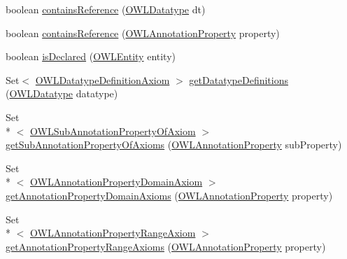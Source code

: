 \begin{DoxyCompactItemize}
\item 
boolean \hyperlink{classuk_1_1ac_1_1manchester_1_1cs_1_1owl_1_1owlapi_1_1_o_w_l_ontology_impl_a3eb0fbd8bcabab6b234bc5ed42908f66}{contains\-Reference} (\hyperlink{interfaceorg_1_1semanticweb_1_1owlapi_1_1model_1_1_o_w_l_datatype}{O\-W\-L\-Datatype} dt)
\item 
boolean \hyperlink{classuk_1_1ac_1_1manchester_1_1cs_1_1owl_1_1owlapi_1_1_o_w_l_ontology_impl_a48f27c2a51e95c68c7d36fbe5a88034d}{contains\-Reference} (\hyperlink{interfaceorg_1_1semanticweb_1_1owlapi_1_1model_1_1_o_w_l_annotation_property}{O\-W\-L\-Annotation\-Property} property)
\item 
boolean \hyperlink{classuk_1_1ac_1_1manchester_1_1cs_1_1owl_1_1owlapi_1_1_o_w_l_ontology_impl_a5e67787dcb7f5c838d063727f772ec26}{is\-Declared} (\hyperlink{interfaceorg_1_1semanticweb_1_1owlapi_1_1model_1_1_o_w_l_entity}{O\-W\-L\-Entity} entity)
\item 
Set$<$ \hyperlink{interfaceorg_1_1semanticweb_1_1owlapi_1_1model_1_1_o_w_l_datatype_definition_axiom}{O\-W\-L\-Datatype\-Definition\-Axiom} $>$ \hyperlink{classuk_1_1ac_1_1manchester_1_1cs_1_1owl_1_1owlapi_1_1_o_w_l_ontology_impl_a67fe947e597cdf74ef70600b6d9d7ecf}{get\-Datatype\-Definitions} (\hyperlink{interfaceorg_1_1semanticweb_1_1owlapi_1_1model_1_1_o_w_l_datatype}{O\-W\-L\-Datatype} datatype)
\item 
Set\\*
$<$ \hyperlink{interfaceorg_1_1semanticweb_1_1owlapi_1_1model_1_1_o_w_l_sub_annotation_property_of_axiom}{O\-W\-L\-Sub\-Annotation\-Property\-Of\-Axiom} $>$ \hyperlink{classuk_1_1ac_1_1manchester_1_1cs_1_1owl_1_1owlapi_1_1_o_w_l_ontology_impl_af7b86eabca9915c6617fe8c8ec7c09de}{get\-Sub\-Annotation\-Property\-Of\-Axioms} (\hyperlink{interfaceorg_1_1semanticweb_1_1owlapi_1_1model_1_1_o_w_l_annotation_property}{O\-W\-L\-Annotation\-Property} sub\-Property)
\item 
Set\\*
$<$ \hyperlink{interfaceorg_1_1semanticweb_1_1owlapi_1_1model_1_1_o_w_l_annotation_property_domain_axiom}{O\-W\-L\-Annotation\-Property\-Domain\-Axiom} $>$ \hyperlink{classuk_1_1ac_1_1manchester_1_1cs_1_1owl_1_1owlapi_1_1_o_w_l_ontology_impl_addb940adaac07ce8a4151308bb84ff6a}{get\-Annotation\-Property\-Domain\-Axioms} (\hyperlink{interfaceorg_1_1semanticweb_1_1owlapi_1_1model_1_1_o_w_l_annotation_property}{O\-W\-L\-Annotation\-Property} property)
\item 
Set\\*
$<$ \hyperlink{interfaceorg_1_1semanticweb_1_1owlapi_1_1model_1_1_o_w_l_annotation_property_range_axiom}{O\-W\-L\-Annotation\-Property\-Range\-Axiom} $>$ \hyperlink{classuk_1_1ac_1_1manchester_1_1cs_1_1owl_1_1owlapi_1_1_o_w_l_ontology_impl_a4afe65d205aa0ea3b8beb7a95553d62f}{get\-Annotation\-Property\-Range\-Axioms} (\hyperlink{interfaceorg_1_1semanticweb_1_1owlapi_1_1model_1_1_o_w_l_annotation_property}{O\-W\-L\-Annotation\-Property} property)

\end{DoxyCompactItemize}
